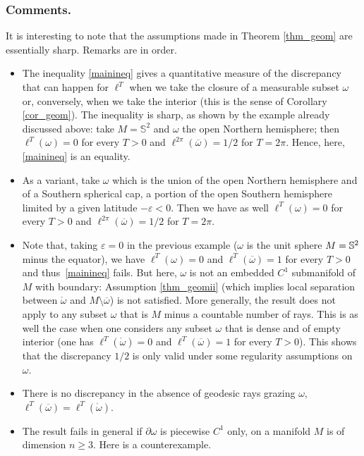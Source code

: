 \documentclass[10pt]{amsart}
\theoremstyle{definition}
\begin{document}
\subsubsection*{Comments.}
It is interesting to note that the assumptions made in Theorem \ref{thm_geom} are essentially sharp. Remarks are in order.
\begin{itemize}
\item The inequality \eqref{mainineq} gives a quantitative measure of the discrepancy that can happen for $\ell^T$ when we take the closure of a measurable subset $\omega$ or, conversely, when we take the interior (this is the sense of Corollary \ref{cor_geom}). The inequality is sharp, as shown by the example already discussed above: take $M=\mathbb{S}^2$ and $\omega$ the open Northern hemisphere; then $\ell^T(\omega)=0$ for every $T>0$ and $\ell^{2\pi}(\overline\omega)=1/2$ for $T=2\pi$. Hence, here, \eqref{mainineq} is an equality.

\item
As a variant, take $\omega$ which is the union of the open Northern hemisphere and of a Southern spherical cap, \ie a portion of the open Southern hemisphere limited by a given latitude $-\varepsilon<0$. Then we have as well $\ell^T(\omega)=0$ for every $T>0$ and $\ell^{2\pi}(\overline\omega)=1/2$ for $T=2\pi$.

\item
Note that, taking $\varepsilon=0$ in the previous example (\ie $\omega$ is the unit sphere $M=\nobreak\mathbb{S}^2$ minus the equator), we have $\ell^T(\omega)=0$ and $\ell^T(\overline\omega)=1$ for every $T>0$ and thus~\eqref{mainineq} fails. But here, $\omega$ is not an embedded $C^1$ submanifold of $M$ with \hbox{boundary}: \hbox{Assumption} \eqref{thm_geomii} (which implies local separation between $\mathring{\omega}$ and $M\setminus\overline\omega$) is not satisfied. More generally, the result does not apply to any subset $\omega$ that is $M$ minus a countable number of rays. This is as well the case when one considers any subset $\omega$ that is dense and of empty interior (one has $\ell^T(\mathring{\omega})=0$ and $\ell^T(\overline\omega)=1$ for every $T>0$). This shows that the discrepancy $1/2$ is only valid under some regularity assumptions on $\omega$.

\item There is no discrepancy in the absence of geodesic rays grazing $\omega$, \ie $\ell^T(\overline\omega)=\ell^T(\mathring{\omega})$.

\item The result fails in general if $\partial\omega$ is piecewise $C^1$ only, on a manifold $M$ is of dimension $n\geq 3$. Here is a counterexample.


\end{itemize}
\end{document}
